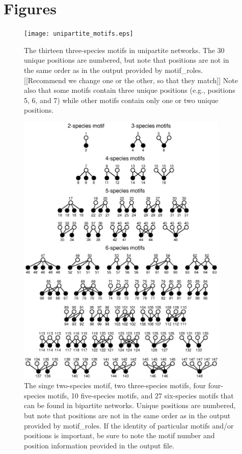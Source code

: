 \documentclass[12pt]{article}
\begin{document}
\clearpage

\section{Figures}

	\begin{figure}[ht]
	  \centering
		\texttt{[image: unipartite\_motifs.eps]}
		\caption{The thirteen three-species motifs in unipartite networks. The 30 unique positions are numbered, but note that positions are not in the same order as in the output provided by motif\_roles. [[Recommend we change one or the other, so that they match]] Note also that some motifs contain three unique positions (e.g., positions 5, 6, and 7) while other motifs contain only one or two unique positions.}
		\label{fig:3sp_unipartite}
	\end{figure}


	\begin{figure}[ht]
	  \centering
		\includegraphics*[width=0.9\textwidth]{bipartite_motifs.eps}
			  \vspace{0.5cm}
		\caption{The singe two-species motif, two three-species motifs, four four-species motifs, 10 five-species motifs, and 27 six-species motifs that can be found in bipartite networks. Unique positions are numbered, but note that positions are not in the same order as in the output provided by motif\_roles. If the identity of particular motifs and/or positions is important, be sure to note the motif number and position information provided in the output file.}
		\label{bipartite_motifs}
	\end{figure}

\clearpage




\clearpage
\end{document}
